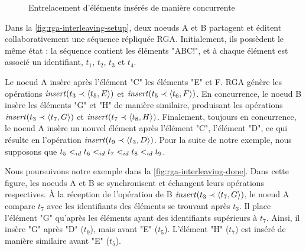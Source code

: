 \begin{figure}[!ht]
{\begin{minipage}{\linewidth}
{
          \label{fig:rga-interleaving-done}
        }
      \end{minipage}
    }
  \caption{Entrelacement d'éléments insérés de manière concurrente}
  \label{fig:rga-interleaving}
\end{figure}

Dans la \autoref{fig:rga-interleaving-setup}, deux noeuds A et B partagent et éditent collaborativement une séquence répliquée \ac{RGA}.
Initialement, ils possèdent le même état : la séquence contient les éléments "ABC!", et à chaque élément est associé un identifiant, \eg $t_1$, $t_2$, $t_3$ et $t_4$.

Le noeud A insère après l'élément "C" les éléments "E" et F.
RGA génère les opérations $\mathit{insert}(t_3 \prec \langle t_5,E \rangle)$ et $\mathit{insert}(t_5 \prec \langle t_6,F \rangle)$.
En concurrence, le noeud B insère les éléments "G" et "H" de manière similaire, produisant les opérations  $\mathit{insert}(t_3 \prec \langle t_7,G \rangle)$ et $\mathit{insert}(t_7 \prec \langle t_8,H \rangle)$.
Finalement, toujours en concurrence, le noeud A insère un nouvel élément après l'élément "C", l'élément "D", ce qui résulte en l'opération $\mathit{insert}(t_9 \prec \langle t_3,D \rangle)$.
Pour la suite de notre exemple, nous supposons que $t_5 <_{id} t_6 <_{id} t_7 <_{id} t_8 <_{id} t_9$.

Nous poursuivons notre exemple dans la \autoref{fig:rga-interleaving-done}.
Dans cette figure, les noeuds A et B se synchronisent et échangent leurs opérations respectives.
À la réception de l'opération de B $\mathit{insert}(t_3 \prec \langle t_7,G \rangle)$, le noeud A compare $t_7$ avec les identifiants des éléments se trouvant après $t_3$.
Il place l'élément "G" qu'après les éléments ayant des identifiants supérieurs à $t_7$.
Ainsi, il insère "G" après "D" ($t_9$), mais avant "E" ($t_5$).
L'élément "H" ($t_7$) est inséré de manière similaire avant "E" ($t_5$).

